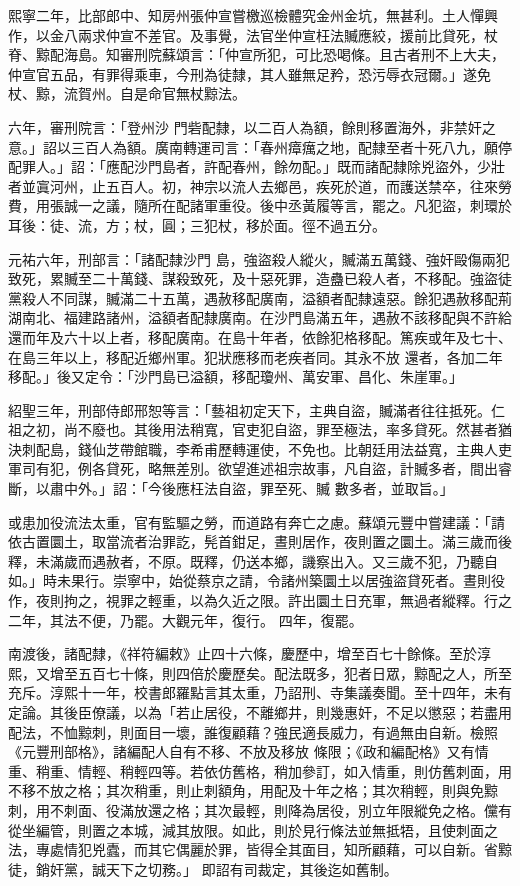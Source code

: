 \begin{pinyinscope}
 熙寧二年，比部郎中、知房州張仲宣嘗檄巡檢體究金州金坑，無甚利。土人憚興作，以金八兩求仲宣不差官。及事覺，法官坐仲宣枉法贓應絞，援前比貸死，杖脊、黥配海島。知審刑院蘇頌言：「仲宣所犯，可比恐喝條。且古者刑不上大夫，仲宣官五品，有罪得乘車，今刑為徒隸，其人雖無足矜，恐污辱衣冠爾。」遂免杖、黥，流賀州。自是命官無杖黥法。



 六年，審刑院言：「登州沙
 門砦配隸，以二百人為額，餘則移置海外，非禁奸之意。」詔以三百人為額。廣南轉運司言：「春州瘴癘之地，配隸至者十死八九，願停配罪人。」詔：「應配沙門島者，許配春州，餘勿配。」既而諸配隸除兇盜外，少壯者並寘河州，止五百人。初，神宗以流人去鄉邑，疾死於道，而護送禁卒，往來勞費，用張誠一之議，隨所在配諸軍重役。後中丞黃履等言，罷之。凡犯盜，刺環於耳後：徒、流，方；杖，圓；三犯杖，移於面。徑不過五分。



 元祐六年，刑部言：「諸配隸沙門
 島，強盜殺人縱火，贓滿五萬錢、強奸毆傷兩犯致死，累贓至二十萬錢、謀殺致死，及十惡死罪，造蠱已殺人者，不移配。強盜徒黨殺人不同謀，贓滿二十五萬，遇赦移配廣南，溢額者配隸遠惡。餘犯遇赦移配荊湖南北、福建路諸州，溢額者配隸廣南。在沙門島滿五年，遇赦不該移配與不許給還而年及六十以上者，移配廣南。在島十年者，依餘犯格移配。篤疾或年及七十、在島三年以上，移配近鄉州軍。犯狀應移而老疾者同。其永不放
 還者，各加二年移配。」後又定令：「沙門島已溢額，移配瓊州、萬安軍、昌化、朱崖軍。」



 紹聖三年，刑部侍郎邢恕等言：「藝祖初定天下，主典自盜，贓滿者往往抵死。仁祖之初，尚不廢也。其後用法稍寬，官吏犯自盜，罪至極法，率多貸死。然甚者猶決刺配島，錢仙芝帶館職，李希甫歷轉運使，不免也。比朝廷用法益寬，主典人吏軍司有犯，例各貸死，略無差別。欲望進述祖宗故事，凡自盜，計贓多者，間出睿斷，以肅中外。」詔：「今後應枉法自盜，罪至死、贓
 數多者，並取旨。」



 或患加役流法太重，官有監驅之勞，而道路有奔亡之慮。蘇頌元豐中嘗建議：「請依古置圜土，取當流者治罪訖，髡首鉗足，晝則居作，夜則置之圜土。滿三歲而後釋，未滿歲而遇赦者，不原。既釋，仍送本鄉，譏察出入。又三歲不犯，乃聽自如。」時未果行。崇寧中，始從蔡京之請，令諸州築圜土以居強盜貸死者。晝則役作，夜則拘之，視罪之輕重，以為久近之限。許出圜土日充軍，無過者縱釋。行之二年，其法不便，乃罷。大觀元年，復行。
 四年，復罷。



 南渡後，諸配隸，《祥符編敕》止四十六條，慶歷中，增至百七十餘條。至於淳熙，又增至五百七十條，則四倍於慶歷矣。配法既多，犯者日眾，黥配之人，所至充斥。淳熙十一年，校書郎羅點言其太重，乃詔刑、寺集議奏聞。至十四年，未有定論。其後臣僚議，以為「若止居役，不離鄉井，則幾惠奸，不足以懲惡；若盡用配法，不恤黥刺，則面目一壞，誰復顧藉？強民適長威力，有過無由自新。檢照《元豐刑部格》，諸編配人自有不移、不放及移放
 條限；《政和編配格》又有情重、稍重、情輕、稍輕四等。若依仿舊格，稍加參訂，如入情重，則仿舊刺面，用不移不放之格；其次稍重，則止刺額角，用配及十年之格；其次稍輕，則與免黥刺，用不刺面、役滿放還之格；其次最輕，則降為居役，別立年限縱免之格。儻有從坐編管，則置之本城，減其放限。如此，則於見行條法並無抵牾，且使刺面之法，專處情犯兇蠹，而其它偶麗於罪，皆得全其面目，知所顧藉，可以自新。省黥徒，銷奸黨，誠天下之切務。」
 即詔有司裁定，其後迄如舊制。




\end{pinyinscope}
